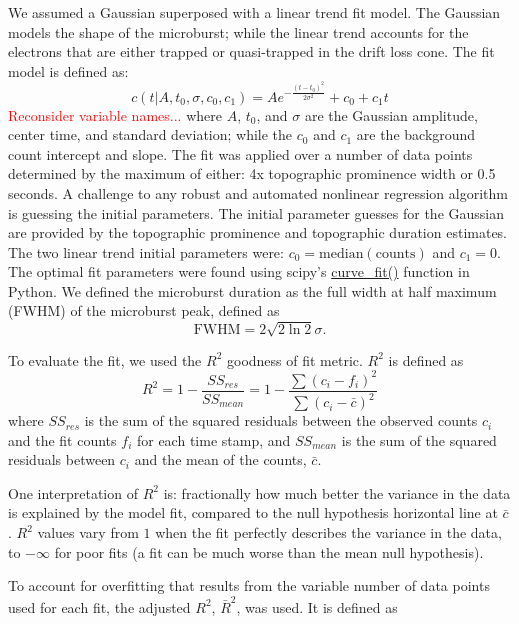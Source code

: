\documentclass[draft]{agujournal2019}
\begin{document}
We assumed a Gaussian superposed with a linear trend fit model. The Gaussian models the shape of the microburst; while the linear trend accounts for the electrons that are either trapped or quasi-trapped in the drift loss cone. The fit model is defined as:
\begin{equation}
c(t | A, t_0, \sigma, c_0, c_1) = A e^{-\frac{(t-t_0)^2}{2\sigma^2}} + c_0 + c_1 t
\end{equation} \textcolor{red}{Reconsider variable names...} where $A$, $t_0$, and $\sigma$ are the Gaussian amplitude, center time, and standard deviation; while the $c_0$ and $c_1$ are the background count intercept and slope. The fit was applied over a number of data points determined by the maximum of either: 4x topographic prominence width or 0.5 seconds. A challenge to any robust and automated nonlinear regression algorithm is guessing the initial parameters. The initial parameter guesses for the Gaussian are provided by the topographic prominence and topographic duration estimates. The two linear trend initial parameters were: $c_0=\mathrm{median(counts)}$ and $c_1=0$. The optimal fit parameters were found using scipy's \url{curve_fit()} function in Python. We defined the microburst duration as the full width at half maximum (FWHM) of the microburst peak, defined as
\begin{equation}
\mathrm{FWHM} = 2\sqrt{2 \ln{2}} \sigma.
\end{equation}

To evaluate the fit, we used the $R^2$ goodness of fit metric. $R^2$ is defined as
\begin{equation}
R^2 = 1 - \frac{SS_{res}}{SS_{mean}} = 1 - \frac{\sum{(c_i-f_i)^2}}{\sum{(c_i-\bar{c})^2}}
\end{equation} where $SS_{res}$ is the sum of the squared residuals between the observed counts $c_i$ and the fit counts $f_i$ for each time stamp, and $SS_{mean}$ is the sum of the squared residuals between $c_i$ and the mean of the counts, $\bar{c}$.

One interpretation of $R^2$ is: fractionally how much better the variance in the data is explained by the model fit, compared to the null hypothesis horizontal line at $\bar{c}$. $R^2$ values vary from $1$ when the fit perfectly describes the variance in the data, to $-\infty$ for poor fits (a fit can be much worse than the mean null hypothesis).

To account for overfitting that results from the variable number of data points used for each fit, the adjusted $R^2$, $\bar{R}^2$, was used. It is defined as
\end{document}
